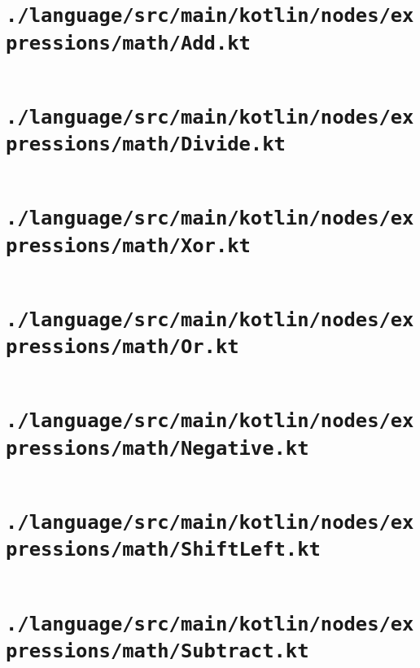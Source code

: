 \documentclass[a4paper, 11pt]{report}
\begin{document}
    \section{\lstinline{./language/src/main/kotlin/nodes/expressions/math/Add.kt}}
    \inputminted{kotlin}{./language/src/main/kotlin/nodes/expressions/math/Add.kt}


    \section{\lstinline{./language/src/main/kotlin/nodes/expressions/math/Divide.kt}}
    \inputminted{kotlin}{./language/src/main/kotlin/nodes/expressions/math/Divide.kt}


    \section{\lstinline{./language/src/main/kotlin/nodes/expressions/math/Xor.kt}}
    \inputminted{kotlin}{./language/src/main/kotlin/nodes/expressions/math/Xor.kt}


    \section{\lstinline{./language/src/main/kotlin/nodes/expressions/math/Or.kt}}
    \inputminted{kotlin}{./language/src/main/kotlin/nodes/expressions/math/Or.kt}


    \section{\lstinline{./language/src/main/kotlin/nodes/expressions/math/Negative.kt}}
    \inputminted{kotlin}{./language/src/main/kotlin/nodes/expressions/math/Negative.kt}


    \section{\lstinline{./language/src/main/kotlin/nodes/expressions/math/ShiftLeft.kt}}
    \inputminted{kotlin}{./language/src/main/kotlin/nodes/expressions/math/ShiftLeft.kt}


    \section{\lstinline{./language/src/main/kotlin/nodes/expressions/math/Subtract.kt}}
    \inputminted{kotlin}{./language/src/main/kotlin/nodes/expressions/math/Subtract.kt}
\end{document}
